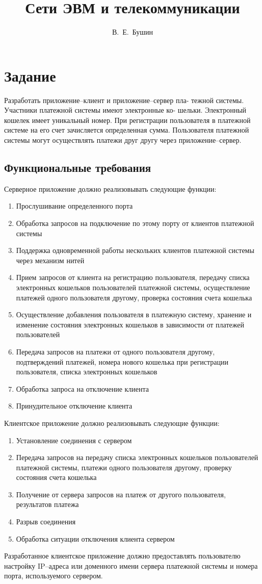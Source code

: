 \documentclass[12pt,a4paper]{report}
\author{В.~Е.~Бушин}
\title{Сети ЭВМ и телекоммуникации}
\begin{document}
\maketitle
\chapter{Задание}
Разработать приложение–клиент и приложение–сервер пла-
тежной системы. Участники платежной системы имеют электронные ко-
шельки. Электронный кошелек имеет уникальный номер. При регистрации
пользователя в платежной системе на его счет зачисляется определенная
сумма. Пользователя платежной системы могут осуществлять платежи
друг другу через приложение–сервер.
\section{Функциональные требования}
Серверное приложение должно реализовывать следующие функции:
\begin{enumerate}	
	\item Прослушивание определенного порта
\item Обработка запросов на подключение по этому порту от клиентов
платежной системы
\item  Поддержка одновременной работы нескольких клиентов платежной
системы через механизм нитей
\item  Прием запросов от клиента на регистрацию пользователя, передачу
списка электронных кошельков пользователей платежной системы,
осуществление платежей одного пользователя другому, проверка состояния счета кошелька
\item  Осуществление добавления пользователя в платежную систему, хранение и изменение состояния электронных кошельков в зависимости
от платежей пользователей
\item  Передача запросов на платежи от одного пользователя другому, подтверждений платежей, номера нового кошелька при регистрации
пользователя, списка электронных кошельков
\item Обработка запроса на отключение клиента
\item  Принудительное отключение клиента
	\end{enumerate}
Клиентское приложение должно реализовывать следующие функции:
\begin{enumerate}	
	\item Установление соединения с сервером
\item Передача запросов на передачу списка электронных кошельков
пользователей платежной системы, платежи одного пользователя
другому, проверку состояния счета кошелька
\item Получение от сервера запросов на платеж от другого пользователя,
результатов платежа
\item Разрыв соединения
\item Обработка ситуации отключения клиента сервером
\end{enumerate}
Разработанное клиентское приложение
должно предоставлять пользователю настройку IP–адреса или доменного
имени сервера платежной системы и номера порта, используемого сервером.
\end{document}
